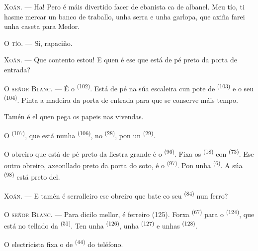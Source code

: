 \textsc{Xoán}. --- Ha! Pero é máis divertido facer de ebanista ca de albanel. Meu
tío, ti hasme mercar un banco de traballo, unha serra e unha garlopa, que axiña
farei unha caseta para Medor.

\textsc{O tío}. --- Si, rapaciño.

\textsc{Xoán}. --- Que contento estou! E quen é ese que está de pé preto da porta de
entrada?

\VUsaut{3.0mm}
\VUsaut{3.0mm}

\textsc{O señor Blanc}. --- É o  \textsuperscript{(102)}. Está de pé
na súa escaleira cun pote de  \textsuperscript{(103)} e o seu
 \textsuperscript{(104)}. Pinta a madeira da porta de entrada para que
se conserve máis tempo.

Tamén é el quen pega os papeis nas vivendas.

O  \textsuperscript{(107)}, que está nunha  \textsuperscript{(106)}, no  \textsuperscript{(28)}, pon un
 \textsuperscript{(29)}.

O obreiro que está de pé preto da fiestra grande é o 
\textsuperscript{(96)}. Fixa os  \textsuperscript{(18)} con
 \textsuperscript{(73)}. Ese outro obreiro, axeonllado preto da porta
do soto, é o  \textsuperscript{(97)}. Pon unha
 \textsuperscript{(6)}. A súa 
\textsuperscript{(98)} está preto del.

\textsc{Xoán}. --- E tamén é serralleiro ese obreiro que bate co seu
 \textsuperscript{(84)} nun ferro?

\textsc{O señor Blanc}. --- Para dicilo mellor, é ferreiro (125). Forxa
 \textsuperscript{(67)} para o 
\textsuperscript{(124)}, que está no tellado da 
\textsuperscript{(51)}. Ten unha  \textsuperscript{(126)}, unha
 \textsuperscript{(127)} e unhas 
\textsuperscript{(128)}.

O electricista fixa o  de  \textsuperscript{(44)} do
teléfono.

\VUsaut{3.0mm}

